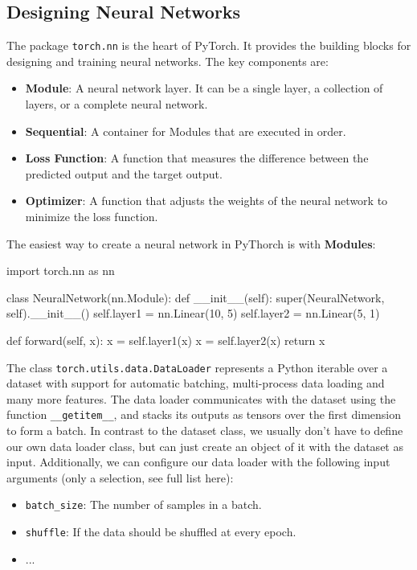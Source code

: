 \subsection*{Designing Neural Networks}

The package \texttt{torch.nn} is the heart of PyTorch. It provides the building blocks for designing and training neural networks. The key components are:

\begin{itemize}
    \item \textbf{Module}: A neural network layer. It can be a single layer, a collection of layers, or a complete neural network.
    \item \textbf{Sequential}: A container for Modules that are executed in order.
    \item \textbf{Loss Function}: A function that measures the difference between the predicted output and the target output.
    \item \textbf{Optimizer}: A function that adjusts the weights of the neural network to minimize the loss function.
\end{itemize}

The easiest way to create a neural network in PyThorch is with \textbf{Modules}:

\begin{codeblock}[language=python]
    import torch.nn as nn

    class NeuralNetwork(nn.Module):
        def __init__(self):
            super(NeuralNetwork, self).__init__()
            self.layer1 = nn.Linear(10, 5)
            self.layer2 = nn.Linear(5, 1)

        def forward(self, x):
            x = self.layer1(x)
            x = self.layer2(x)
            return x
\end{codeblock}

The class \texttt{torch.utils.data.DataLoader} represents a Python iterable over a dataset with
support for automatic batching, multi-process data loading and many more features. The data
loader communicates with the dataset using the function \texttt{\_\_getitem\_\_}, and stacks its outputs as
tensors over the first dimension to form a batch. In contrast to the dataset class, we usually don’t
have to define our own data loader class, but can just create an object of it with the dataset as
input. Additionally, we can configure our data loader with the following input arguments (only a
selection, see full list here):
\begin{itemize}
    \item \texttt{batch\_size}: The number of samples in a batch.
    \item \texttt{shuffle}: If the data should be shuffled at every epoch.
    \item ...
\end{itemize}


